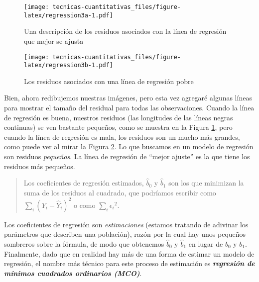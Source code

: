 \documentclass[
]{book}
\begin{document}
\begin{figure}
\centering
\texttt{[image: tecnicas-cuantitativas\_files/figure-latex/regression3a-1.pdf]}
\caption{\label{fig:regression3a}Una descripción de los residuos asociados con la línea de regresión que mejor se ajusta}
\end{figure}

\begin{figure}
\centering
\texttt{[image: tecnicas-cuantitativas\_files/figure-latex/regression3b-1.pdf]}
\caption{\label{fig:regression3b}Los residuos asociados con una línea de regresión pobre}
\end{figure}

Bien, ahora redibujemos nuestras imágenes, pero esta vez agregaré algunas líneas para mostrar el tamaño del residual para todas las observaciones. Cuando la línea de regresión es buena, nuestros residuos (las longitudes de las líneas negras continuas) se ven bastante pequeños, como se muestra en la Figura \ref{fig:regression3a}, pero cuando la línea de regresión es mala, los residuos son un mucho más grandes, como puede ver al mirar la Figura \ref{fig:regression3b}. Lo que buscamos en un modelo de regresión son residuos \emph{pequeños}. La línea de regresión de ``mejor ajuste'' es la que tiene los residuos más pequeños.

\begin{quote}
Los coeficientes de regresión estimados, \(\hat{b}_0\) y \(\hat{b}_1\) son los que minimizan la suma de los residuos al cuadrado, que podríamos escribir como \(\sum_i(Y_i-\hat{Y}_i)^2\) o como \(\sum_i{\epsilon_i}^2\).
\end{quote}

Los coeficientes de regresión son \emph{estimaciones} (estamos tratando de adivinar los parámetros que describen una población), razón por la cual hay unos pequeños sombreros sobre la fórmula, de modo que obtenemos \(\hat{b}_0\) y \(\hat{b}_1\) en lugar de \(b_0\) y \(b_1\). Finalmente, dado que en realidad hay más de una forma de estimar un modelo de regresión, el nombre más técnico para este proceso de estimación es \textbf{\emph{regresión de mínimos cuadrados ordinarios (MCO)}}.
\end{document}
